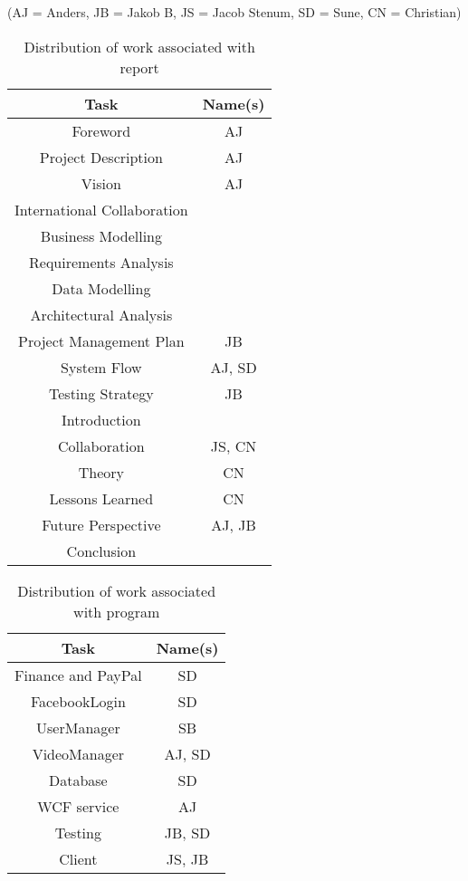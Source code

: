 \label{Distribution of Work}
(AJ = Anders, JB = Jakob B, JS = Jacob Stenum, SD = Sune, CN = Christian)\\
\begin{table}[H]
\caption{Distribution of work associated with report}
\centering

\begin{tabular}{c c}
Task & Name(s) \\ [1.5ex] 
\hline
Foreword & AJ \\
Project Description & AJ \\
Vision & AJ\\
International Collaboration & \\
Business Modelling & \\
Requirements Analysis & \\
Data Modelling & \\
Architectural Analysis & \\
Project Management Plan & JB \\
System Flow & AJ, SD\\
Testing Strategy & JB\\
Introduction & \\
Collaboration & JS, CN \\
Theory & CN \\
Lessons Learned & CN\\
Future Perspective & AJ, JB \\
Conclusion & \\

\end{tabular}
\end{table}
\newpage
\begin{table}[H]
\caption{Distribution of work associated with program}
\centering
\begin{tabular}{c c}
Task & Name(s)\\ [1.5ex] 
\hline
Finance and PayPal & SD \\
FacebookLogin & SD \\
UserManager & SB \\
VideoManager & AJ, SD \\
Database & SD \\
WCF service & AJ\\
Testing & JB, SD \\
Client & JS, JB\\


\end{tabular}
\end{table}

